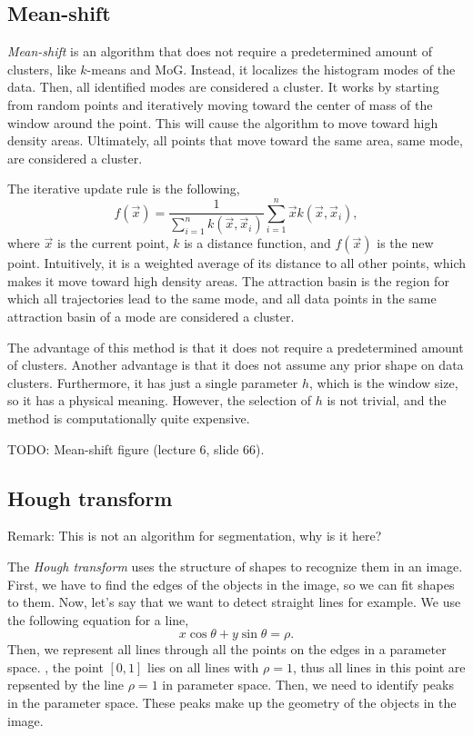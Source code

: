 \subsection{Mean-shift}

\textit{Mean-shift} is an algorithm that does not require a predetermined
amount of clusters, like $k$-means and MoG. Instead, it localizes the histogram
modes of the data. Then, all identified modes are considered a cluster. It
works by starting from random points and iteratively moving toward the center
of mass of the window around the point. This will cause the algorithm to move
toward high density areas. Ultimately, all points that move toward the same
area, \ie same mode, are considered a cluster.

The iterative update rule is the following, \[
  f(\vec{x}) = \frac{1}{\sum_{i=1}^n k(\vec{x},\vec{x}_i)} \sum_{i=1}^n \vec{x} k(\vec{x},\vec{x}_i)
,\]
where $\vec{x}$ is the current point, $k$ is a distance function, and
$f(\vec{x})$ is the new point. Intuitively, it is a weighted average of its
distance to all other points, which makes it move toward high density areas.
The attraction basin is the region for which all trajectories lead to the same
mode, and all data points in the same attraction basin of a mode are considered
a cluster.

The advantage of this method is that it does not require a predetermined
amount of clusters. Another advantage is that it does not assume any prior
shape on data clusters. Furthermore, it has just a single parameter $h$,
which is the window size, so it has a physical meaning. However, the
selection of $h$ is not trivial, and the method is computationally quite
expensive.

TODO: Mean-shift figure (lecture 6, slide 66).

\subsection{Hough transform}

Remark: This is not an algorithm for segmentation, why is it here?

The \textit{Hough transform} uses the structure of shapes to recognize them in
an image. First, we have to find the edges of the objects in the image, so we
can fit shapes to them. Now, let's say that we want to detect straight lines
for example. We use the following equation for a line, \[
  x\cos\theta + y\sin\theta = \rho
.\]
Then, we represent all lines through all the points on the edges in a
parameter space. \Eg, the point $[0,1]$ lies on all lines with $\rho=1$, thus
all lines in this point are repsented by the line $\rho=1$ in parameter
space. Then, we need to identify peaks in the parameter space. These peaks
make up the geometry of the objects in the image.

